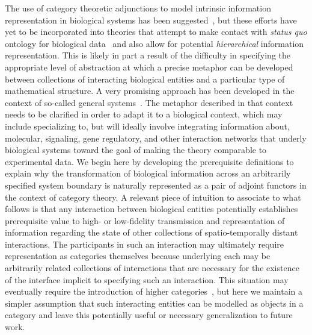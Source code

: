 \documentclass[aps,twocolumn]{revtex4-1}
\begin{document}
The use of category theoretic adjunctions to model intrinsic information representation in biological systems has been suggested~\cite{GOGUEN1979,Ellerman2005}, but these efforts have yet to be incorporated into theories that attempt to make contact with {\it status quo} ontology for biological data~\cite{Demir2010} and also allow for potential {\it hierarchical} information representation. This is likely in part a result of the difficulty in specifying the appropriate level of abstraction at which a precise metaphor can be developed between collections of interacting biological entities and a particular type of mathematical structure. A very promising approach has been developed in the context of so-called general systems~\cite{Zafiris2005a,Zafiris2005b,Zafiris2012}. The metaphor described in that context needs to be clarified in order to adapt it to a biological context, which may include specializing to, but will ideally involve integrating information about, molecular, signaling, gene regulatory, and other interaction networks that underly biological systems toward the goal of making the theory comparable to experimental data. We begin here by developing the prerequisite definitions to explain why the transformation of biological information across an arbitrarily specified system boundary is naturally represented as a pair of adjoint functors in the context of category theory. A relevant piece of intuition to associate to what follows is that any interaction between biological entities potentially establishes prerequisite value to high- or low-fidelity transmission and representation of information regarding the state of other collections of spatio-temporally distant interactions. The participants in such an interaction may ultimately require representation as categories themselves because underlying each may be arbitrarily related collections of interactions that are necessary for the existence of the interface implicit to specifying such an interaction. This situation may eventually require the introduction of higher categories~\cite{Lein2004}, but here we maintain a simpler assumption that such interacting entities can be modelled as objects in a category and leave this potentially useful or necessary generalization to future work.
\end{document}
